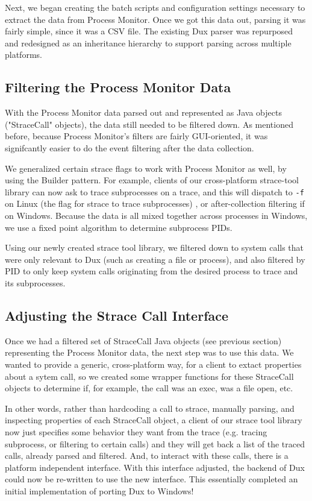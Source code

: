 \documentclass[10pt,conference]{IEEEtran}
\begin{document}
Next, we began creating the batch scripts and configuration settings necessary to
extract the data from Process Monitor. Once we got this data out, parsing it was 
fairly simple, since it was a CSV file. The existing Dux parser was repurposed and
redesigned as an inheritance hierarchy to support parsing across multiple platforms.

\subsection{Filtering the Process Monitor Data}

With the Process Monitor data parsed out and represented as Java objects ("StraceCall"
objects), the data still needed to be filtered down. As mentioned before, because
Process Monitor's filters are fairly GUI-oriented, it was signifcantly easier to
do the event filtering after the data collection.

We generalized certain strace flags to work with Process Monitor as well, by using
the Builder pattern. For example, clients of our cross-platform strace-tool library
can now ask to trace subprocesses on a trace, and this will dispatch to \texttt{-f} on
Linux (the flag for strace to trace subprocesses) , or after-collection filtering
if on Windows. Because the data is all mixed together across processes in Windows,
we use a fixed point algorithm to determine subprocess PIDs.

Using our newly created strace tool library, we filtered down to system calls
that were only relevant to Dux (such as creating a file or process), and also
filtered by PID to only keep system calls originating from the desired process
to trace and its subprocesses. 

\subsection{Adjusting the Strace Call Interface}

Once we had a filtered set of StraceCall Java objects (see previous section)
representing the Process Monitor data, the next step was to use this data. We
wanted to provide a generic, cross-platform way, for a client to extact properties
about a sytem call, so we created some wrapper functions for these StraceCall
objects to determine if, for example, the call was an exec, was a file open, etc.

In other words, rather than hardcoding a call to strace, manually parsing, 
and inspecting properties of each StraceCall object, a client of our strace tool
library now just specifies some behavior they want from the trace
(e.g. tracing subprocess, or filtering to certain calls) and they will get back a list
of the traced calls, already parsed and filtered. And, to interact with these calls,
there is a platform independent interface. With this interface adjusted, the
backend of Dux could now be re-written to use the new interface. This essentially
completed an initial implementation of porting Dux to Windows!
\end{document}

